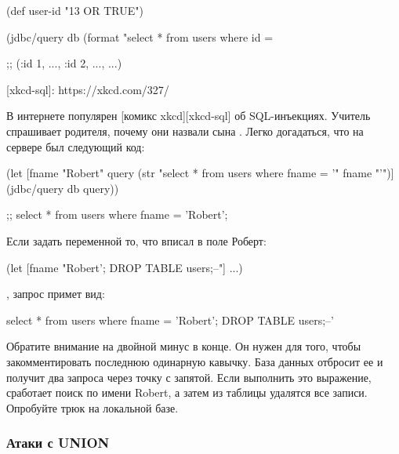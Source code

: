 \begin{english}
  \begin{clojure}
(def user-id "13 OR TRUE")

(jdbc/query db
  (format "select * from users where id = %

;; ({:id 1, ...}, {:id 2, ...}, ...)
  \end{clojure}
\end{english}

[xkcd-sql]: https://xkcd.com/327/

В интернете популярен [комикс xkcd][xkcd-sql] об SQL-инъекциях. Учитель спрашивает родителя, почему они назвали сына . Легко догадаться, что на сервере был следующий код:

\begin{english}
  \begin{clojure}
(let [fname "Robert"
      query (str "select * from users where fname = '" fname "'")]
  (jdbc/query db query))

;; select * from users where fname = 'Robert';
  \end{clojure}
\end{english}

Если задать переменной  то, что вписал в поле Роберт:

\begin{english}
  \begin{clojure}
(let [fname "Robert'; DROP TABLE users;--"]
  ...)
  \end{clojure}
\end{english}

\noindent
, запрос примет вид:

\begin{english}
  \begin{sql}
select * from users where fname = 'Robert'; DROP TABLE users;--'
  \end{sql}
\end{english}

Обратите внимание на двойной минус в конце. Он нужен для того, чтобы закомментировать последнюю одинарную кавычку. База данных отбросит ее и получит два запроса через точку с запятой. Если выполнить это выражение, сработает поиск по имени Robert, а затем из таблицы  удалятся все записи. Опробуйте трюк на локальной базе.

\subsubsection{Атаки с UNION}

